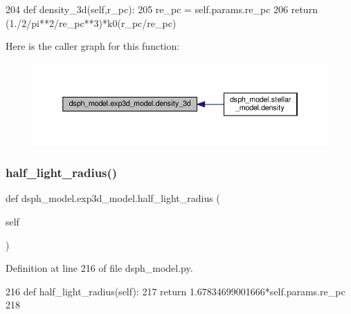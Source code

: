\begin{DoxyCode}
204     \textcolor{keyword}{def }density\_3d(self,r\_pc):
205         re\_pc = self.params.re\_pc
206         \textcolor{keywordflow}{return} (1./2/pi**2/re\_pc**3)*k0(r\_pc/re\_pc)
\end{DoxyCode}
Here is the caller graph for this function\+:\nopagebreak
\begin{figure}[H]
\begin{center}
\leavevmode
\includegraphics[width=350pt]{dc/d37/classdsph__model_1_1exp3d__model_ae31f24dee429dda1409429bf62fea05d_icgraph}
\end{center}
\end{figure}
\mbox{\label{classdsph__model_1_1exp3d__model_a7f12e007771f65a024fc044331eb2f62}} 
\subsubsection{\texorpdfstring{half\+\_\+light\+\_\+radius()}{half\_light\_radius()}}
{\footnotesize\ttfamily def dsph\+\_\+model.\+exp3d\+\_\+model.\+half\+\_\+light\+\_\+radius (\begin{DoxyParamCaption}\item[{}]{self }\end{DoxyParamCaption})}



Definition at line 216 of file dsph\+\_\+model.\+py.


\begin{DoxyCode}
216     \textcolor{keyword}{def }half\_light\_radius(self):
217         \textcolor{keywordflow}{return} 1.67834699001666*self.params.re\_pc
218         
\end{DoxyCode}
\mbox{\label{classdsph__model_1_1exp3d__model_a0dae92e16b158e09e47517706236f83d}} 
